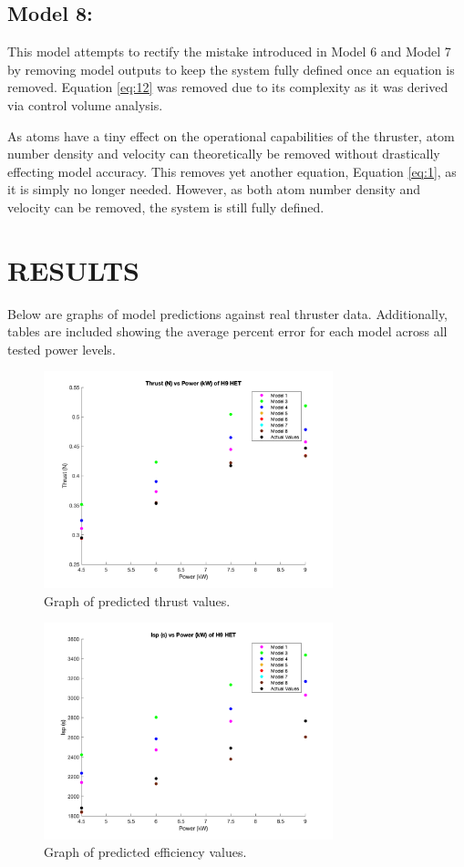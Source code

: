 \documentclass[letterpaper, 10 pt, conference]{ieeeconf}  %
\begin{document}
\subsection{Model 8:}
This model attempts to rectify the mistake introduced in Model 6 and Model 7 by removing model outputs to keep the system fully defined once an equation is removed. Equation \ref{eq:12} was removed due to its complexity as it was derived via control volume analysis.

As atoms have a tiny effect on the operational capabilities of the thruster, atom number density and velocity can theoretically be removed without drastically effecting model accuracy. This removes yet another equation, Equation \ref{eq:1}, as it is simply no longer needed. However, as both atom number density and velocity can be removed, the system is still fully defined. 

\section{RESULTS}

Below are graphs of model predictions against real thruster data. Additionally, tables are included showing the average percent error for each model across all tested power levels.

\begin{figure}[H]
      \centering
      \includegraphics[width=3.3in]{Images/t_vs_p.png}
      \caption{Graph of predicted thrust values.}
      \label{fig:7}
\end{figure}

\begin{figure}[H]
      \centering
      \includegraphics[width=3.3in]{Images/isp_vs_p.png}
      \caption{Graph of predicted efficiency values.}
      \label{fig:8}
\end{figure}
\end{document}
